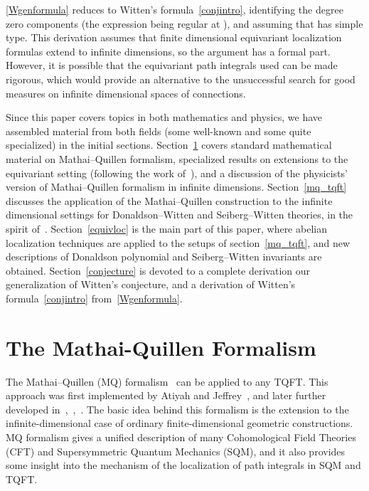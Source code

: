 \documentclass[a4paper,12pt,reqno,sumlimits]{amsart}
\theoremstyle{plain}
\theoremstyle{definition}
\providecommand{\1}{{\bf 1}}
\numberwithin{equation}{section}
\begin{document}
\eqref{Wgenformula} reduces to Witten's formula~\eqref{conjintro},
identifying the degree zero components (the expression being regular at
\coordHE{}), and assuming that \coordHE{} has simple type.  This derivation assumes that
finite dimensional equivariant localization formulas extend to infinite
dimensions, so the argument has a formal part.  However, it is possible that
the equivariant path integrals used can be made rigorous, which would provide
an alternative to the unsuccessful search for good measures on infinite
dimensional spaces of connections.

Since this paper covers topics in both mathematics and physics, we have
assembled material from both fields (some well-known and some quite
specialized) in the initial sections.  Section~\ref{mq} covers standard
mathematical material on Mathai--Quillen formalism, specialized results on
extensions to the equivariant setting (following the work of~\cite{radu}),
and a discussion of the physicists' version of Mathai--Quillen formalism in
infinite dimensions.  Section~\ref{mq_tqft} discusses the application of the
Mathai--Quillen construction to the infinite dimensional settings for
Donaldson--Witten and Seiberg--Witten theories, in the spirit of~\cite{radu}.
Section~\ref{equivloc} is the main part of this paper, where abelian
localization techniques are applied to the setups of section~\ref{mq_tqft},
and new descriptions of Donaldson polynomial and Seiberg--Witten invariants
are obtained.  Section~\ref{conjecture} is devoted to a complete derivation
our generalization of Witten's conjecture, and a derivation of Witten's
formula~\eqref{conjintro} from~\eqref{Wgenformula}.


\section{The Mathai-Quillen Formalism}
\label{mq}

The Mathai--Quillen (MQ) formalism~\cite{mq} can be applied to any TQFT. This
approach was first implemented by Atiyah and Jeffrey~\cite{aj}, and later
further developed in~\cite{blau},~\cite{radu},~\cite{cordes}.  The basic idea
behind this formalism is the extension to the infinite-dimensional case of
ordinary finite-dimensional geometric constructions.  MQ formalism gives a
unified description of many Cohomological Field Theories (CFT) and
Supersymmetric Quantum Mechanics (SQM), and it also provides some insight
into the mechanism of the localization of path integrals in SQM and TQFT.
\end{document}
